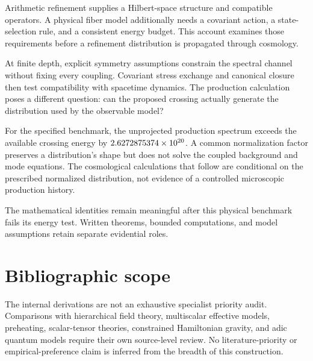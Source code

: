 \documentclass[11pt,twoside,openany]{book}
\theoremstyle{definition}
\theoremstyle{remark}
\begin{document}
\mainmatter
{}
Arithmetic refinement supplies a Hilbert-space structure and compatible operators. A physical fiber model additionally needs a covariant action, a state-selection rule, and a consistent energy budget. This account examines those requirements before a refinement distribution is propagated through cosmology.

At finite depth, explicit symmetry assumptions constrain the spectral channel without fixing every coupling. Covariant stress exchange and canonical closure then test compatibility with spacetime dynamics. The production calculation poses a different question: can the proposed crossing actually generate the distribution used by the observable model?

\begin{negativebox}
For the specified benchmark, the unprojected production spectrum exceeds the available crossing energy by $2.6272875374\times 10^{20}$. A common normalization factor preserves a distribution's shape but does not solve the coupled background and mode equations. The cosmological calculations that follow are conditional on the prescribed normalized distribution, not evidence of a controlled microscopic production history.
\end{negativebox}
The mathematical identities remain meaningful after this physical benchmark fails its energy test. Written theorems, bounded computations, and model assumptions retain separate evidential roles.








\appendix

\section*{Bibliographic scope}
The internal derivations are not an exhaustive specialist priority audit. Comparisons with hierarchical field theory, multiscalar effective models, preheating, scalar-tensor theories, constrained Hamiltonian gravity, and adic quantum models require their own source-level review. No literature-priority or empirical-preference claim is inferred from the breadth of this construction.
\end{document}
